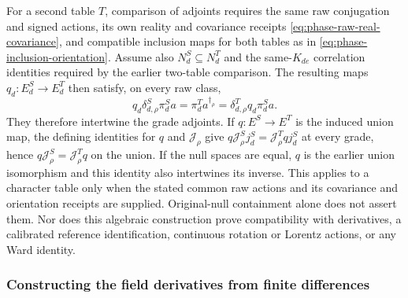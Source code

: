For a second table $T$, comparison of adjoints requires the same raw
conjugation and signed actions, its own reality and covariance receipts
\eqref{eq:phase-raw-real-covariance}, and compatible inclusion maps for
both tables as in \eqref{eq:phase-inclusion-orientation}. Assume also
$N_d^S\subseteq N_d^T$ and the same-$K_{de}$ correlation identities
required by the earlier two-table comparison. The resulting maps
$q_d:E_d^S\to E_d^T$ then satisfy, on every raw class,
\[
 q_d\delta^S_{d,\rho}\pi_d^Sa
   =\pi_d^T a^{\dagger_\rho}
   =\delta^T_{d,\rho}q_d\pi_d^Sa.
\]
They therefore intertwine the grade adjoints. If $q:E^S\to E^T$ is the
induced union map, the defining identities for $q$ and $\mathcal J_\rho$
give $q\mathcal J^S_\rho j_d^S=\mathcal J^T_\rho qj_d^S$ at every
grade, hence $q\mathcal J^S_\rho=\mathcal J^T_\rho q$ on the union.
If the null spaces are equal, $q$ is the earlier union isomorphism and
this identity also intertwines its inverse. This applies to a character
table only when the stated common raw actions and its covariance and
orientation receipts are supplied. Original-null containment alone does
not assert them. Nor does this algebraic construction prove compatibility
with derivatives, a calibrated reference identification, continuous
rotation or Lorentz actions, or any Ward identity.


\subsubsection{Constructing the field derivatives from finite differences}
\label{subsec:phase-field-derivatives}

